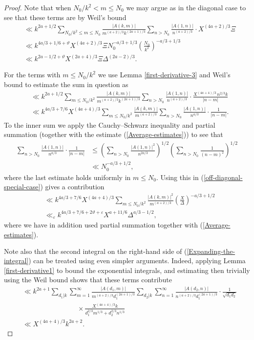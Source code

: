 \documentclass[a4paper,10pt,twoside]{amsart}
\theoremstyle{definition}
\numberwithin{equation}{section}
\renewcommand\:{\colon}
\begin{document}
\begin{proof}
Note that when $N_0/k^2<m\leq N_0$ we may argue as in the diagonal case to see that these terms are by Weil's bound 
\begin{align}\label{Estimate-3}
&\ll k^{2a+1/2}\sum_{N_0/k^2\leq m\leq N_0}\frac{|A(k,m)|}{m^{(a+2)/3}k^{(2a+1)/3}}\sum_{n>N_0}\frac{|A(1,n)|}{n^{(a+2)/3}}\cdot X^{(4a+2)/3}\Xi \nonumber\\
&\ll k^{4a/3+1/6+\vartheta}X^{(4a+2)/3}\Xi N_0^{-a/3+1/3}\left(\frac{N_0}{k^2}\right)^{-a/3+1/3} \nonumber\\
&\ll k^{2a-1/2+\vartheta}X^{(2a+4)/3}\Xi\Delta^{(2a-2)/3}.
\end{align}

For the terms with $m\leq N_0/k^2$ we use Lemma \ref{first-derivative-3} and Weil's bound to estimate the sum in question as
\begin{align}\label{off-diagonal-special-case}
&\ll k^{2a+1/2}\sum_{m\leqslant N_0/k^2}\frac{\left|A(k,m)\right|}{m^{(a+2)/3}k^{(2a+1)/3}}\sum_{n>N_0}\frac{\left|A(1,n)\right|}{n^{(a+2)/3}}\cdot\frac{X^{(4a+4)/3}\,n^{2/3}k}{|n-m|} \nonumber\\
&\ll k^{4a/3+7/6}X^{(4a+4)/3}\sum_{m\leq N_0/k^2}\frac{|A(k,m)|}{m^{(a+2)/3}}\sum_{n>N_0}\frac{|A(1,n)|}{n^{a/3}}\cdot\frac1{|n-m|}.
\end{align}
To the inner sum we apply the Cauchy--Schwarz inequality and partial summation (together with the estimate (\ref{Average-estimates})) to see that 
\begin{align*}
\sum_{n>N_0}\frac{|A(1,n)|}{n^{a/3}}\cdot\frac1{|n-m|}&\leq\left(\sum_{n>N_0}\frac{|A(1,n)|^2}{n^{2a/3}}\right)^{1/2}\left(\sum_{n>N_0}\frac1{(n-m)^2}\right)^{1/2} \\
&\ll N_0^{-a/3+1/2},
\end{align*}
where the last estimate holds uniformly in $m\leq N_0$. Using this in (\ref{off-diagonal-special-case}) gives a contribution 
\begin{align}\label{Estimate-4}
&\ll k^{4a/3+7/6}X^{(4a+4)/3}\sum_{m\leq N_0/k^2}\frac{|A(k,m)|^2}{m^{(a+2)/3}}\left(\frac X\Delta\right)^{-a/3+1/2} \nonumber \\
&\ll_\varepsilon k^{4a/3+7/6+2\vartheta+\varepsilon}X^{a+11/6}\Delta^{a/3-1/2},
\end{align} 
where we have in addition used partial summation together with (\ref{Average-estimates}).

Note also that the second integral on the right-hand side of (\ref{Expanding-the-integral}) can be treated using even simpler arguments. Indeed, applying Lemma \ref{first-derivative1} to bound the exponential integrals, and estimating then trivially using the Weil bound shows that these terms contribute
\begin{align}\label{second-integral}
&\ll k^{2a+1}\sum_{d_1|k}\sum_{m=1}^\infty\frac{|A(d_1,m)|}{m^{(a+2)/3}d_1^{(2a+1)/3}}\sum_{d_2|k}\sum_{n=1}^\infty\frac{|A(d_2,n)|}{n^{(a+2)/3}d_1^{(2a+1)/3}}\cdot\frac1{\sqrt{d_1d_2}} \nonumber\\
&\qquad\qquad\qquad\qquad\times\frac{X^{(4a+4)/3}k}{d_1^{2/3}m^{1/3}+d_2^{2/3}n^{1/3}} \nonumber \\
&\ll X^{(4a+4)/3}k^{2a+2}.
\end{align} 
  

\end{proof}
\end{document}
